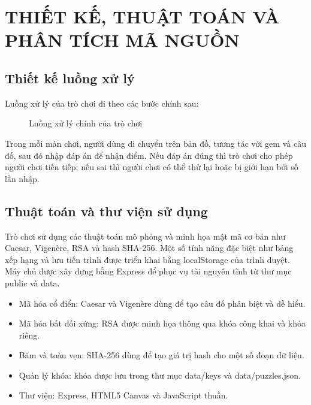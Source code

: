 \chapter{THIẾT KẾ, THUẬT TOÁN VÀ PHÂN TÍCH MÃ NGUỒN}

\section{Thiết kế luồng xử lý}

Luồng xử lý của trò chơi đi theo các bước chính sau:

\begin{figure}[H]
\centering
{}
\caption{Luồng xử lý chính của trò chơi}
\label{fig:flow-game}
\end{figure}

Trong mỗi màn chơi, người dùng di chuyển trên bản đồ, tương tác với gem và câu đố, sau đó nhập đáp án để nhận điểm. Nếu đáp án đúng thì trò chơi cho phép người chơi tiến tiếp; nếu sai thì người chơi có thể thử lại hoặc bị giới hạn bởi số lần nhập.

\section{Thuật toán và thư viện sử dụng}

Trò chơi sử dụng các thuật toán mô phỏng và minh họa mật mã cơ bản như Caesar, Vigenère, RSA và hash SHA-256. Một số tính năng đặc biệt như bảng xếp hạng và lưu tiến trình được triển khai bằng localStorage của trình duyệt. Máy chủ được xây dựng bằng Express để phục vụ tài nguyên tĩnh từ thư mục public và data.

\begin{itemize}
    \item Mã hóa cổ điển: Caesar và Vigenère dùng để tạo câu đố phân biệt và dễ hiểu.
    \item Mã hóa bất đối xứng: RSA được minh họa thông qua khóa công khai và khóa riêng.
    \item Băm và toàn vẹn: SHA-256 dùng để tạo giá trị hash cho một số đoạn dữ liệu.
    \item Quản lý khóa: khóa được lưu trong thư mục data/keys và data/puzzles.json.
    \item Thư viện: Express, HTML5 Canvas và JavaScript thuần.
\end{itemize}

